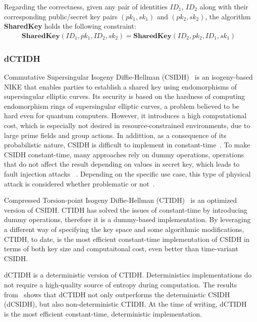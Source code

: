 Regarding the correctness, given any pair of identities $ID_1$, $ID_2$ along with their
corresponding public/secret key pairs $(pk_1,sk_1)$ and $(pk_2, sk_2)$, the algorithm
\textbf{SharedKey} holds the following constraint:
\begin{align*}
    \textbf{SharedKey}(ID_1,pk_1,ID_2,sk_2) = \textbf{SharedKey}(ID_2,pk_2,ID_1,sk_1)
\end{align*}

\subsubsection{dCTIDH}
Commutative Supersingular Isogeny Diffie-Hellman (CSIDH)~\cite{csidh} is an isogeny-based NIKE that
enables parties to establish a shared key using endomorphisms of supersingular elliptic curves.
Its security is based on the hardness of computing endomorphism rings of supersingular
elliptic curves, a problem believed to be hard even for quantum computers. However,
it introduces a high computational cost, which is especially not desired in resource-constrained
environments, due to large prime fields and group actions. In addittion, as a consequence of its probabilistic
nature, CSIDH is difficult to implement in constant-time~\cite{csidh}. To make CSIDH constant-time,
many approaches rely on dummy operations, operations that do not affect the result
depending on values in secret key, which leads to fault injection attacks
~\cite{csidh-fault-injection,csidh-fault-injection-2}. Depending on the specific use case,
this type of physical attack is considered whether problematic or not~\cite{dctidh}.

Compressed Torsion-point Isogeny Diffie-Hellman (CTIDH)~\cite{ctidh} is an optimized version of CSIDH\@.
CTIDH has solved the issues of constant-time by introducing dummy operations, therefore it is
a dummy-based implementation. By leveraging a different way of specifying the key space and
some algorithmic modifications, CTIDH, to date, is the most efficient constant-time implementation
of CSIDH in terms of both key size and computaitonal cost, even better than time-variant CSIDH\@.

dCTIDH is a deterministic version of CTIDH\@. Deterministics implementations do not require
a high-quality source of entropy during computation. The results from~\cite{dctidh} shows
that dCTIDH not only outperforms the deterministic CSIDH (dCSIDH), but also
non-deterministic CTIDH\@. At the time of writing, dCTIDH is the most efficient
constant-time, deterministic implementation.

